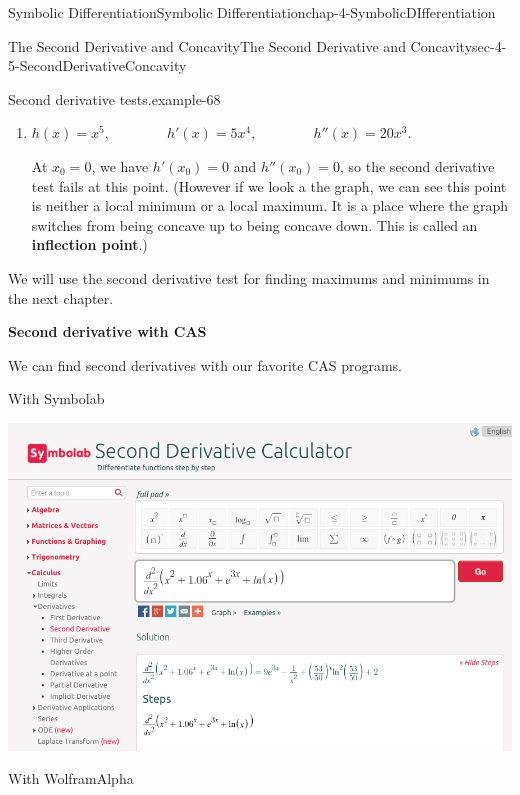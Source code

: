 \documentclass[oneside,10pt,]{book}
\newcommand{\terminology}[1]{\textbf{#1}}
\numberwithin{equation}{section}
\begin{document}
\begin{chapterptx}{Symbolic Differentiation}{}{Symbolic Differentiation}{}{}{chap-4-SymbolicDIfferentiation}
\begin{sectionptx}{The Second Derivative and Concavity}{}{The Second Derivative and Concavity}{}{}{sec-4-5-SecondDerivativeConcavity}
\begin{example}{Second derivative tests.}{example-68}
\begin{enumerate}[label=(\alph*)]
\item\hypertarget{li-539}{}\hypertarget{p-1811}{}%
\(h(x)=x^5,\qquad\qquad h'(x)=5x^4,\qquad\qquad h''(x)=20x^3\).%
\par
\hypertarget{p-1812}{}%
At \(x_0=0\), we have \(h'(x_0)=0\) and \(h''(x_0)=0\), so the second derivative test fails at this point.  (However if we look a the graph, we can see this point is neither a local minimum or a local maximum.  It is a place where the graph switches from being concave up to being concave down.  This is called an \terminology{inflection point}.)%
\end{enumerate}
\end{example}
\hypertarget{p-1813}{}%
We will use the second derivative test for finding maximums and minimums in the next chapter.%
\par
\hypertarget{p-1814}{}%
\terminology{Second derivative with CAS}%
\par
\hypertarget{p-1815}{}%
We can find second derivatives with our favorite CAS programs.%
\par
\hypertarget{p-1816}{}%
With Symbolab%
\begin{sidebyside}{1}{0.1}{0.1}{0}%
\begin{sbspanel}{0.8}%
\includegraphics[width=1\linewidth]{images/sec4-5-3.png}
\end{sbspanel}%
\end{sidebyside}%
\par
\hypertarget{p-1817}{}%
With WolframAlpha%
\begin{sidebyside}{1}{0.1}{0.1}{0}%
\begin{sbspanel}{0.8}%

\end{sbspanel}
\end{sidebyside}
\end{sectionptx}
\end{chapterptx}
\end{document}
